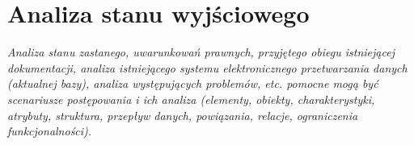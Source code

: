 \section{Analiza stanu wyjściowego}


\textit{Analiza stanu zastanego, uwarunkowań prawnych, przyjętego
obiegu istniejącej dokumentacji, analiza istniejącego systemu elektronicznego
przetwarzania danych (aktualnej bazy), analiza występujących problemów, etc. pomocne
mogą być scenariusze postępowania i ich analiza (elementy, obiekty, charakterystyki,
atrybuty, struktura, przepływ danych, powiązania, relacje, ograniczenia funkcjonalności).} \\



